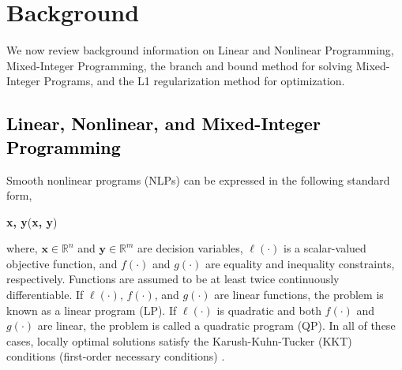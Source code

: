 \documentclass[runningheads]{llncs}
\newcommand{\todo}[1]{\textcolor{red}{TODO: #1}}
\newcommand{\changes}[1]{\textcolor{black}{#1}}
\begin{document}

\section{Background} \label{sec:background}
We now review background information on Linear and Nonlinear Programming, Mixed-Integer Programming, the branch and bound method for solving Mixed-Integer Programs, and the L1 regularization method for optimization. 
\subsection{\changes{Linear, Nonlinear, and Mixed-Integer Programming}}
Smooth nonlinear programs (NLPs) can be expressed in the following standard form,
\begin{mini!}
{\textbf{x, y}}{\ell(\textbf{x, y})}
{\label{eq:optimization}}{}
\end{mini!}
where, $\textbf{x} \in \mathbb{R}^n$ and $\textbf{y} \in \mathbb{R}^m$ are decision variables, $\ell(\cdot)$ is a scalar-valued objective function, and $f(\cdot)$ and $g(\cdot)$ are equality and inequality constraints, respectively. Functions are assumed to be at least twice continuously differentiable.
If $\ell(\cdot)$, $f(\cdot)$, and $g(\cdot)$ are linear functions, the problem is known as a linear program (LP). If $\ell(\cdot)$ is quadratic and both $f(\cdot)$ and $g(\cdot)$ are linear, the problem is called a quadratic program (QP). In all of these cases, locally optimal solutions satisfy the Karush-Kuhn-Tucker (KKT) conditions (first-order necessary conditions) \cite{kuhn1950kkt}. %
\end{document}
